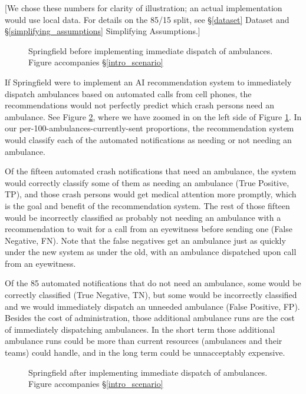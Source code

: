 [We chose these numbers for clarity of illustration; an actual implementation would use local data.  For details on the 85/15 split, see \S\ref{dataset} Dataset and \S\ref{simplifying_assumptions} Simplifying Assumptions.]

\begin{figure}[h]
	
\caption{\normalfont\normalsize Springfield before implementing immediate dispatch of ambulances.  Figure accompanies \S\ref{intro_scenario}}
\label{intro_springfield_before}
\end{figure}

\FloatBarrier

If Springfield were to implement an AI recommendation system to immediately dispatch ambulances based on automated calls from cell phones, the recommendations would not perfectly predict which crash persons need an ambulance.    See Figure \ref{intro_springfield_after}, where we have zoomed in on the left side of Figure \ref{intro_springfield_before}. In our per-100-ambulances-currently-sent proportions, the recommendation system would classify each of the automated notifications as needing or not needing an ambulance.  

Of the fifteen automated crash notifications that need an ambulance, the system would correctly classify some of them as needing an ambulance (True Positive, TP), and those crash persons would get medical attention more promptly, which is the goal and benefit of the recommendation system.  The rest of those fifteen would be incorrectly classified as probably not needing an ambulance with a recommendation to wait for a call from an eyewitness before sending one (False Negative, FN).  Note that the false negatives get an ambulance just as quickly under the new system as under the old,  with an ambulance dispatched upon call from an eyewitness.  

Of the 85 automated notifications that do not need an ambulance, some would be correctly classified (True Negative, TN), but some would be incorrectly classified and we would immediately dispatch an unneeded ambulance (False Positive, FP).  Besides the cost of administration, those additional ambulance runs are the cost of immediately dispatching ambulances.  In the short term those additional ambulance runs could be more than current resources (ambulances and their teams) could handle, and in the long term could be unnacceptably expensive.  

\begin{figure}[h]
	
\caption{\normalfont\normalsize Springfield after implementing immediate dispatch of ambulances.  Figure accompanies \S\ref{intro_scenario}}
\label{intro_springfield_after}
\end{figure}

